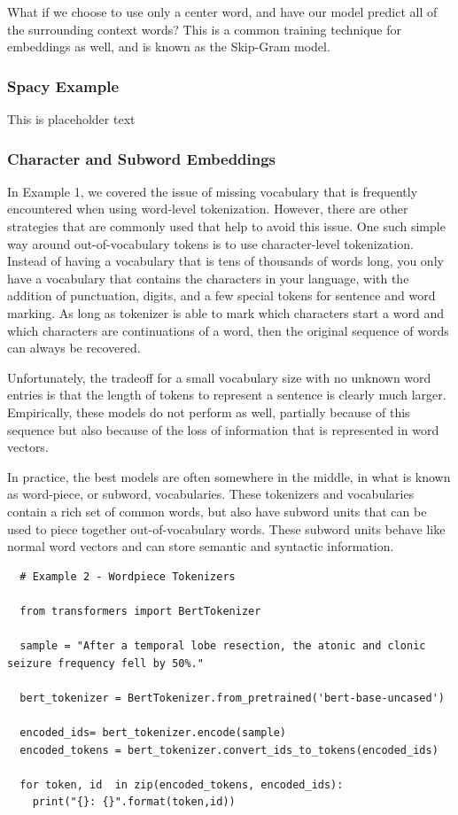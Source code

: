 What if we choose to use only a center word, and have our model predict all of the surrounding context words? This is a common training technique for embeddings as well, and is known as the Skip-Gram model.

\subsubsection{Spacy Example}
This is placeholder text

\subsubsection{Character and Subword Embeddings}

In Example 1, we covered the issue of missing vocabulary that is frequently encountered when using word-level tokenization. However, there are other strategies that are commonly used that help to avoid this issue.
One such simple way around out-of-vocabulary tokens is to use character-level tokenization. Instead of having a vocabulary that is tens of thousands of words long, you only have a vocabulary that contains the characters in
your language, with the addition of punctuation, digits, and a few special tokens for sentence and word marking. As long as tokenizer is able to mark which characters start a word and which characters are continuations
of a word, then the original sequence of words can always be recovered.

Unfortunately, the tradeoff for a small vocabulary size with no unknown word entries is that the length of tokens to represent a sentence is clearly much larger. Empirically, these models do not perform as well,
partially because of this sequence but also because of the loss of information that is represented in word vectors.

In practice, the best models are often somewhere in the middle, in what is known as word-piece, or subword, vocabularies. These tokenizers and vocabularies contain a rich set of common words, but also have subword units
that can be used to piece together out-of-vocabulary words. These subword units behave like normal word vectors and can store semantic and syntactic information.


\begin{verbatim}
  # Example 2 - Wordpiece Tokenizers

  from transformers import BertTokenizer

  sample = "After a temporal lobe resection, the atonic and clonic seizure frequency fell by 50%."

  bert_tokenizer = BertTokenizer.from_pretrained('bert-base-uncased')

  encoded_ids= bert_tokenizer.encode(sample)
  encoded_tokens = bert_tokenizer.convert_ids_to_tokens(encoded_ids)

  for token, id  in zip(encoded_tokens, encoded_ids):
    print("{}: {}".format(token,id))
\end{verbatim}


